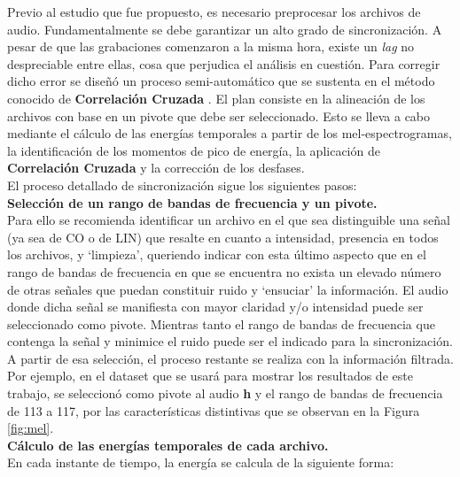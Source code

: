 \documentclass[a4paper,10pt,twocolumn]{article}
\begin{document}
Previo al estudio que fue propuesto, es necesario preprocesar los archivos de audio. 
Fundamentalmente se debe garantizar un alto grado de sincronización.
A pesar de que las grabaciones comenzaron a la misma hora, existe un \textit{lag} no 
despreciable entre ellas, cosa que perjudica el análisis en cuestión. 
Para corregir dicho error se diseñó un proceso semi-automático que se sustenta
en el método conocido de \textbf{Correlación Cruzada} \cite{cross_corr}. El plan consiste en 
la alineación de los archivos con base en un pivote que debe ser seleccionado.
Esto se lleva a cabo mediante el cálculo de las energías temporales a partir de los mel-espectrogramas,
la identificación de los momentos de pico de energía, la aplicación de \textbf{Correlación Cruzada} y 
la corrección de los desfases.\\


El proceso detallado de sincronización sigue los siguientes pasos:\\


\textbf{Selección de un rango de bandas de frecuencia y un pivote.}\\

Para ello se recomienda identificar un archivo en el que sea distinguible
una señal (ya sea de CO o de LIN) que resalte en cuanto a intensidad,
presencia en todos los archivos, y `limpieza', queriendo indicar con
esta último aspecto que en el rango de bandas de frecuencia en que se encuentra
no exista un elevado número de otras señales que puedan constituir ruido
y `ensuciar' la información. El audio donde dicha señal se manifiesta
con mayor claridad y/o intensidad puede ser seleccionado como pivote.
Mientras tanto el rango de bandas de frecuencia que contenga la señal y minimice
el ruido puede ser el indicado para la sincronización. A partir de esa selección,
el proceso restante se realiza con la información filtrada.\\

Por ejemplo, en el dataset que se usará para mostrar los resultados de este trabajo, 
se seleccionó como pivote al audio \textbf{h} y el rango de bandas de frecuencia de 113 a 117,
por las características distintivas que se observan en la Figura \ref{fig:mel}.\\

\textbf{Cálculo de las energías temporales de cada archivo.}\\

En cada instante de tiempo, la energía se calcula de la siguiente forma:\\
\end{document}
